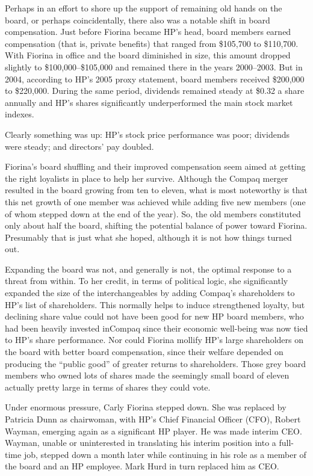 \documentclass[10pt]{article}
\begin{document}
{\large Perhaps in an effort to shore up the support of remaining old hands on
the board, or perhaps coincidentally, there also was a notable shift in board
compensation. Just before Fiorina became HP's head, board members earned
compensation (that is, private benefits) that ranged from \$105,700 to \$110,700.
With Fiorina in office and the board diminished in size, this amount dropped
slightly to \$100,000--\$105,000 and remained there in the years 2000--2003. But
in 2004, according to HP's 2005 proxy statement, board members received \$200,000
to \$220,000. During the same period, dividends remained steady at \$0.32 a share
annually and HP's shares significantly underperformed the main stock market
indexes.}

{\large Clearly something was up: HP's stock price performance was poor;
dividends were steady; and directors' pay doubled.}

{\large Fiorina's board shuffling and their improved compensation seem aimed at
getting the right loyalists in place to help her survive. Although the Compaq
merger resulted in the board growing from ten to eleven, what is most noteworthy
is that this net growth of one member was achieved while adding five new members
(one of whom stepped down at the end of the year). So, the old members
constituted only about half the board, shifting the potential balance of power
toward Fiorina. Presumably that is just what she hoped, although it is not how
things turned out.}

{\large Expanding the board was not, and generally is not, the optimal response
to a threat from within. To her credit, in terms of political logic, she
significantly expanded the size of the interchangeables by adding Compaq's
shareholders to HP's list of shareholders. This normally helps to induce
strengthened loyalty, but declining share value could not have been good for new
HP board members, who had been heavily invested inCompaq since their economic
well-being was now tied to HP's share performance. Nor could Fiorina mollify HP's
large shareholders on the board with better board compensation, since their
welfare depended on producing the ``public good'' of greater returns to
shareholders. Those grey board members who owned lots of shares made the
seemingly small board of eleven actually pretty large in terms of shares they
could vote.}

{\large Under enormous pressure, Carly Fiorina stepped down. She was replaced by
Patricia Dunn as chairwoman, with HP's Chief Financial Officer (CFO), Robert
Wayman, emerging again as a significant HP player. He was made interim CEO.
Wayman, unable or uninterested in translating his interim position into a
full-time job, stepped down a month later while continuing in his role as a
member of the board and an HP employee. Mark Hurd in turn replaced him as CEO.}
\end{document}
